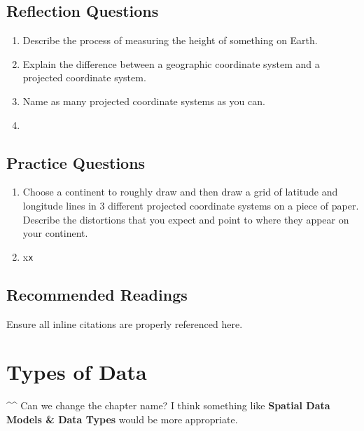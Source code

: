 \documentclass[
]{book}
\providecommand{\tightlist}{%
  \setlength{\itemsep}{0pt}\setlength{\parskip}{0pt}}
\begin{document}
\hypertarget{reflection-questions}{%
\section*{Reflection Questions}\label{reflection-questions}}

\begin{enumerate}
\def\labelenumi{\arabic{enumi}.}
\tightlist
\item
  Describe the process of measuring the height of something on Earth.
\item
  Explain the difference between a geographic coordinate system and a projected coordinate system.
\item
  Name as many projected coordinate systems as you can.
\item
\end{enumerate}

\hypertarget{practice-questions}{%
\section*{Practice Questions}\label{practice-questions}}

\begin{enumerate}
\def\labelenumi{\arabic{enumi}.}
\tightlist
\item
  Choose a continent to roughly draw and then draw a grid of latitude and longitude lines in 3 different projected coordinate systems on a piece of paper. Describe the distortions that you expect and point to where they appear on your continent.
\item
  x\texttt{x}
\end{enumerate}

\hypertarget{recommended-readings}{%
\section*{Recommended Readings}\label{recommended-readings}}

Ensure all inline citations are properly referenced here.

\hypertarget{types-of-data}{%
\chapter{Types of Data}\label{types-of-data}}

\^{}\^{} Can we change the chapter name? I think something like \textbf{Spatial Data Models \& Data Types} would be more appropriate.
\end{document}
